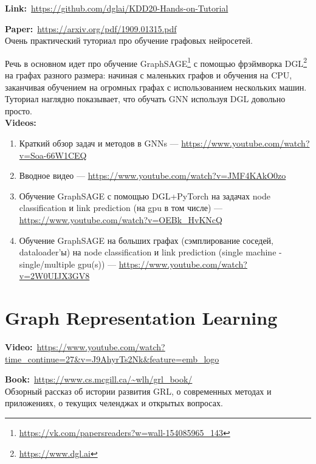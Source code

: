 \textbf{Link:}~\url{https://github.com/dglai/KDD20-Hands-on-Tutorial}

\textbf{Paper:}~\url{https://arxiv.org/pdf/1909.01315.pdf} \\

Очень практический туториал про обучение графовых нейросетей. 

Речь в основном идет про обучение GraphSAGE\footnote{\url{https://vk.com/papersreaders?w=wall-154085965_143}} с помощью фрэймворка DGL\footnote{\url{https://www.dgl.ai}} на графах разного размера: начиная с маленьких графов и обучения на CPU, заканчивая обучением на огромных графах с использованием нескольких машин. \\

Туториал наглядно показывает, что обучать GNN используя DGL довольно просто. \\

\textbf{Videos:}

\begin{enumerate}
    \item Краткий обзор задач и методов в GNNs --- \url{https://www.youtube.com/watch?v=Soa-66W1CEQ}
    \item Вводное видео --- \url{https://www.youtube.com/watch?v=JMF4KAkO0zo}
    \item Обучение GraphSAGE с помощью DGL+PyTorch на задачах node classification и link prediction (на gpu в том числе) --- \url{https://www.youtube.com/watch?v=OEBk_HvKNcQ}
    \item Обучение GraphSAGE на больших графах (сэмплирование соседей, dataloader'ы) на node classification и link prediction (single machine - single/multiple gpu(s)) --- \url{https://www.youtube.com/watch?v=2W0UIJX3GV8}
\end{enumerate}


\section*{Graph Representation Learning}

\textbf{Video:}~\url{https://www.youtube.com/watch?time_continue=27&v=J9AhyrTs2Nk&feature=emb_logo}

\textbf{Book:}~\url{https://www.cs.mcgill.ca/~wlh/grl_book/} \\

Обзорный рассказ об истории развития GRL, о современных методах и приложениях, о текущих челенджах и открытых вопросах.

